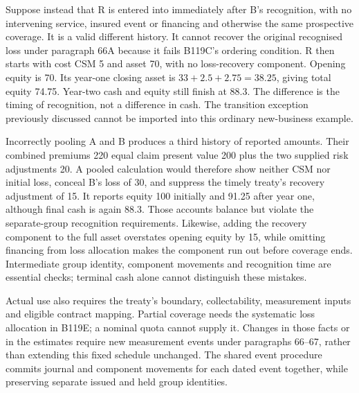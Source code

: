 Suppose instead that R is entered into immediately after B's recognition,
with no intervening service, insured event or financing and otherwise the
same prospective coverage. It is a valid different history. It cannot
recover the original recognised loss under paragraph 66A because it fails
B119C's ordering condition. R then starts with cost CSM 5 and asset 70,
with no loss-recovery component. Opening equity is 70. Its year-one closing
asset is \(33+2.5+2.75=38.25\), giving total equity 74.75. Year-two cash
and equity still finish at 88.3. The difference is the timing of recognition,
not a difference in cash. The transition exception previously discussed
cannot be imported into this ordinary new-business example.

Incorrectly pooling A and B produces a third history of reported amounts.
Their combined premiums 220 equal claim present value 200 plus the two
supplied risk adjustments 20. A pooled calculation would therefore show
neither CSM nor initial loss, conceal B's loss of 30, and suppress the timely
treaty's recovery adjustment of 15. It reports equity 100 initially and
91.25 after year one, although final cash is again 88.3. Those accounts
balance but violate the separate-group recognition requirements. Likewise,
adding the recovery component to the full asset overstates opening equity
by 15, while omitting financing from loss allocation makes the component
run out before coverage ends. Intermediate group identity, component
movements and recognition time are essential checks; terminal cash alone
cannot distinguish these mistakes.

Actual use also requires the treaty's boundary, collectability, measurement
inputs and eligible contract mapping. Partial coverage needs the systematic
loss allocation in B119E; a nominal quota cannot supply it. Changes in those
facts or in the estimates require new measurement events under paragraphs
66--67, rather than extending this fixed schedule unchanged. The shared
event procedure commits journal and component movements for each dated
event together, while preserving separate issued and held group identities.
\citep[paragraphs 24, 63--67, 78--86 and B119C--B119F]{aasb17}

